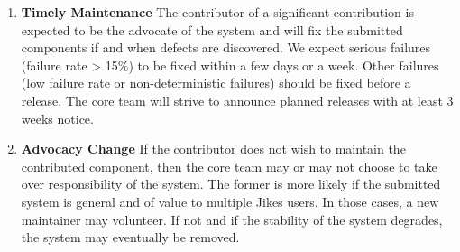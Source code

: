 \begin{enumerate}
\item {\bf Timely Maintenance}  
The contributor of a significant contribution is expected to be the
advocate of the system and will fix the submitted components if and
when defects are discovered.  We expect serious failures (failure rate
> 15\%) to be fixed within a few days or a week.  Other failures (low
failure rate or non-deterministic failures) should be fixed before a
release.  The core team will strive to announce planned releases with
at least 3 weeks notice.

\item {\bf Advocacy Change}  
If the contributor does not wish to maintain the contributed
component, then the core team may or may not choose to take over
responsibility of the system.  The former is more likely if the
submitted system is general and of value to multiple Jikes users.  
In those cases, a new maintainer may volunteer.  If not and if the
stability of the system degrades, the system may eventually be
removed.

\end{enumerate}
